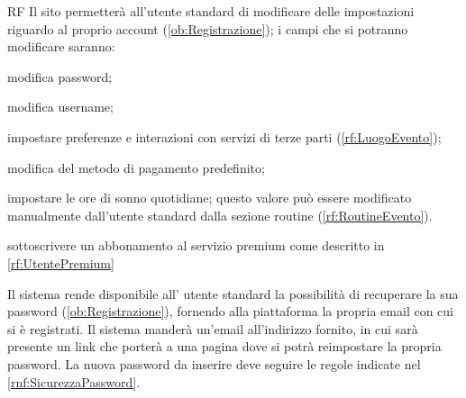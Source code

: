 \begin{listaPersonale}{RF}
	 Il sito permetterà all'utente standard di modificare delle impostazioni riguardo al proprio account (\ref{ob:Registrazione}); i campi che si potranno modificare saranno:
	\begin{listaPersonale2}[RF]{}
		 modifica password;

		 modifica username;

		 impostare preferenze e interazioni con servizi di terze parti (\ref{rf:LuogoEvento});

		 modifica del metodo di pagamento predefinito;

		 impostare le ore di sonno quotidiane; questo valore può essere modificato manualmente dall'utente standard dalla sezione routine (\ref{rf:RoutineEvento}).

		 sottoscrivere un abbonamento al servizio premium come descritto in \ref{rf:UtentePremium}
	\end{listaPersonale2}

	        Il sistema rende disponibile all' utente standard la possibilità di recuperare la sua password (\ref{ob:Registrazione}), fornendo alla piattaforma la propria email con cui si è registrati. Il sistema manderà un'email all'indirizzo fornito, in cui sarà presente un link che porterà a una pagina dove si potrà reimpostare la propria password. La nuova password da inserire deve seguire le regole indicate nel  \ref{rnf:SicurezzaPassword}. %
\end{listaPersonale}